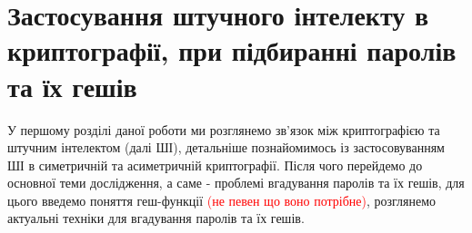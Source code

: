 
\chapter{Застосування штучного інтелекту в криптографії, при підбиранні паролів та їх гешів}
\label{chap:review}  %
У першому розділі даної роботи ми розглянемо зв'язок між криптографією та штучним інтелектом (далі ШІ), детальніше познайомимось із застосовуванням ШІ в симетричній та асиметричній криптографії. Після чого перейдемо до основної теми дослідження, а саме - проблемі вгадування паролів та їх гешів, для цього введемо поняття геш-функції \textcolor{red}{(не певен що воно потрібне)}, розглянемо актуальні техніки для вгадування паролів та їх гешів.     






